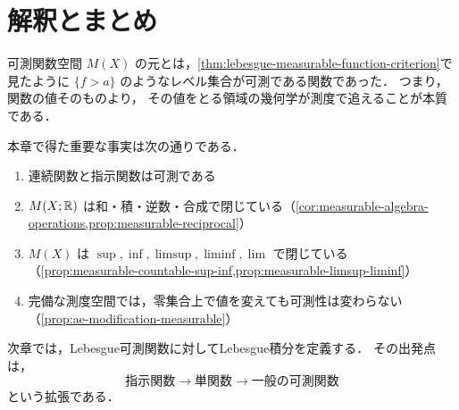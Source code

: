 \section{解釈とまとめ}

可測関数空間 $M(X)$ の元とは，\cref{thm:lebesgue-measurable-function-criterion}で見たように
$\{f>a\}$ のようなレベル集合が可測である関数であった．
つまり，関数の値そのものより，
その値をとる領域の幾何学が測度で追えることが本質である．

本章で得た重要な事実は次の通りである．
\begin{enumerate}
    \item 連続関数と指示関数は可測である
    \item $M(X;\mathbb R)$ は和・積・逆数・合成で閉じている（\cref{cor:measurable-algebra-operations,prop:measurable-reciprocal}）
    \item $M(X)$ は $\sup,\inf,\limsup,\liminf,\lim$ で閉じている（\cref{prop:measurable-countable-sup-inf,prop:measurable-limsup-liminf}）
    \item 完備な測度空間では，零集合上で値を変えても可測性は変わらない（\cref{prop:ae-modification-measurable}）
\end{enumerate}

次章では，Lebesgue可測関数に対してLebesgue積分を定義する．
その出発点は，
\[
\text{指示関数} \to \text{単関数} \to \text{一般の可測関数}
\]
という拡張である．

